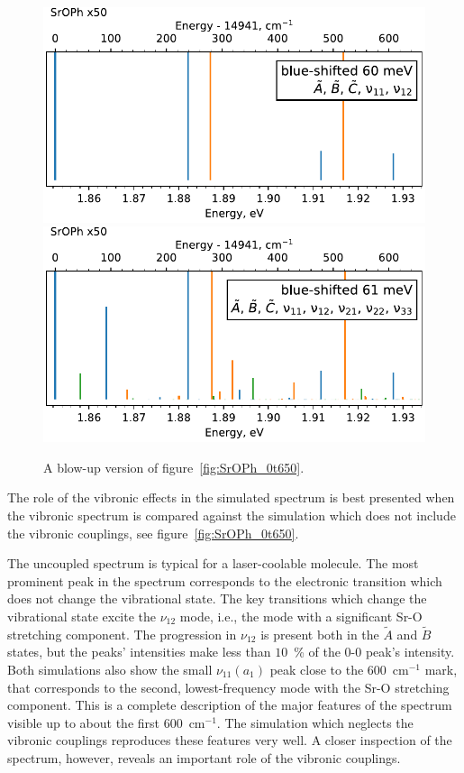 \documentclass{article}
\begin{document}
\begin{figure}
    \begin{center}
        \includegraphics[width=12 cm]{figures/SrOPh_0t650_no_couplings_zoom.pdf}
        \includegraphics[width=12 cm]{figures/SrOPh_0t650_zoom.pdf}
    \end{center}
    \caption{
        A blow-up version of figure~\ref{fig:SrOPh_0t650}.
    }
    \label{fig:SrOPh_0t650_zoom}
\end{figure}

The role of the vibronic effects in the simulated spectrum is best presented
when the vibronic spectrum is compared against the simulation which does not
include the vibronic couplings, see figure~\ref{fig:SrOPh_0t650}.

The uncoupled spectrum is typical for a laser-coolable molecule. The most
prominent peak in the spectrum corresponds to the electronic transition which
does not change the vibrational state. The key transitions which change the
vibrational state excite the $\nu _{12}$ mode, i.e., the mode with a
significant Sr-O stretching component. The progression in $\nu _{12}$ is
present both in the $\tilde{A}$ and $\tilde{B}$ states, but the peaks'
intensities make less than $10$~\% of the 0-0 peak's intensity. Both
simulations also show the small $\nu _{11} (a _1)$ peak close to the
$600$~cm$^{-1}$ mark, that corresponds to the second, lowest-frequency mode
with the Sr-O stretching component. This is a complete description of the major
features of the spectrum visible up to about the first $600$~cm$^{-1}$. The
simulation which neglects the vibronic couplings reproduces these features very
well. A closer inspection of the spectrum, however, reveals an important role
of the vibronic couplings.
\end{document}
